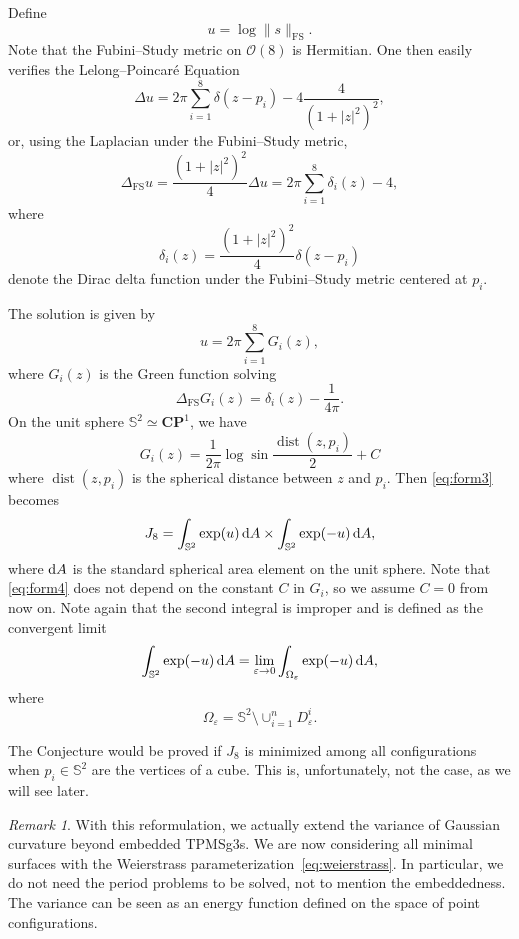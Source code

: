 \documentclass[a4paper]{amsart}
\newcommand{\CP}{\mathbf{CP}}
\newcommand{\cO}{\mathcal{O}}
\newcommand{\FS}{\text{FS}}
\newcommand{\uS}{\mathbb{S}}
\newcommand{\laplace}{\Delta}
\newcommand{\dist}{\operatorname{dist}}
\newcommand{\dd}{{\rm d}}
\theoremstyle{plain} %
\theoremstyle{definition} %
\theoremstyle{remark}
\newtheorem{remark}{Remark}
\begin{document}
Define
\[
	u = \log \| s \|_\FS.
\]
Note that the Fubini--Study metric on $\cO(8)$ is Hermitian.  One then easily verifies the
Lelong--Poincar\'e Equation
\[
	\laplace u = 2\pi \sum_{i=1}^8 \delta(z-p_i) - 4\frac{4}{(1+|z|^2)^2},
\]
or, using the Laplacian under the Fubini--Study metric,
\[
	\laplace_\FS u = \frac{(1+|z|^2)^2}{4} \laplace u
	= 2\pi \sum_{i=1}^8 \delta_i(z) - 4,
\]
where
\[
	\delta_i(z) = \frac{(1+|z|^2)^2}{4} \delta(z-p_i)
\]
denote the Dirac delta function under the Fubini--Study metric centered at
$p_i$.

The solution is given by
\[
	u = 2\pi \sum_{i = 1}^8 G_i(z),
\]
where $G_i(z)$ is the Green function solving
\begin{equation}\label{eq:laplaceG}
	\laplace_\FS G_i(z) = \delta_i(z) - \frac{1}{4\pi}.
\end{equation}
On the unit sphere $\uS^2 \simeq \CP^1$, we have
\begin{equation}\label{eq:Green}
	G_i(z) = \frac{1}{2\pi} \log \sin \frac{\dist(z, p_i)}{2} + C
\end{equation}
where $\dist(z, p_i)$ is the spherical distance between $z$ and $p_i$.  Then
\eqref{eq:form3} becomes
\begin{equation}\label{eq:form4}
	J_8 =
	\int_{\uS^2} \exp(u) \, \dd A \times
	\int_{\uS^2} \exp(-u) \, \dd A,
\end{equation}
where $\dd A$ is the standard spherical area element on the unit sphere.
Note that \eqref{eq:form4} does not depend on the constant $C$ in $G_i$, so we
assume $C=0$ from now on.  Note again that the second integral is improper and
is defined as the convergent limit
\[
	\int_{\uS^2} \exp(-u) \, \dd A = \lim_{\varepsilon \to 0}
	\int_{\Omega_\varepsilon} \exp(-u) \, \dd A,
\]
where
\[
	\Omega_\varepsilon = \uS^2 \setminus \cup_{i=1}^n D^i_\varepsilon.
\]

The Conjecture would be proved if $J_8$ is minimized among all configurations
when $p_i \in \uS^2$ are the vertices of a cube.  This is, unfortunately, not
the case, as we will see later.

\begin{remark}
	With this reformulation, we actually extend the variance of Gaussian
	curvature beyond embedded TPMSg3s.  We are now considering all minimal
	surfaces with the Weierstrass parameterization~\eqref{eq:weierstrass}.  In
	particular, we do not need the period problems to be solved, not to mention
	the embeddedness.  The variance can be seen as an energy function defined on
	the space of point configurations.
\end{remark}
\end{document}
